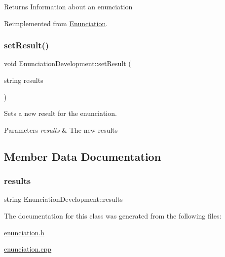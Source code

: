 \begin{DoxyReturn}{Returns}
Information about an enunciation 
\end{DoxyReturn}


Reimplemented from \hyperlink{class_enunciation_a032b5ff494595ab52d152d605544525c}{Enunciation}.

\mbox{\label{class_enunciation_development_afeefc36344ab2cf3949e9bcc9e9f839b}} 
\subsubsection{\texorpdfstring{set\+Result()}{setResult()}}
{\footnotesize\ttfamily void Enunciation\+Development\+::set\+Result (\begin{DoxyParamCaption}\item[{string}]{results }\end{DoxyParamCaption})}



Sets a new result for the enunciation. 


\begin{DoxyParams}{Parameters}
{\em results} & The new results \\
\hline
\end{DoxyParams}


\subsection{Member Data Documentation}
\mbox{\label{class_enunciation_development_abc152492be3a1049b84b581022f0bf6f}} 
\subsubsection{\texorpdfstring{results}{results}}
{\footnotesize\ttfamily string Enunciation\+Development\+::results\hspace{0.3cm}{\ttfamily [protected]}}



The documentation for this class was generated from the following files\+:\begin{DoxyCompactItemize}
\item 
\hyperlink{enunciation_8h}{enunciation.\+h}\item 
\hyperlink{enunciation_8cpp}{enunciation.\+cpp}\end{DoxyCompactItemize}
